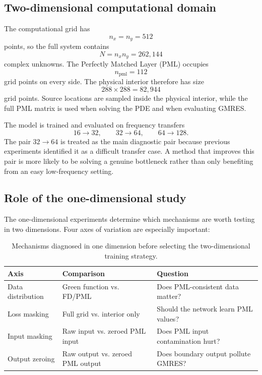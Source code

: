 \subsection{Two-dimensional computational domain}
\label{subsec:methodology_2d_grid}

The computational grid has
\[
    n_x = n_y = 512
\]
points, so the full system contains
\[
    N = n_x n_y = 262{,}144
\]
complex unknowns. The Perfectly Matched Layer (PML) occupies
\[
    n_{\mathrm{pml}} = 112
\]
grid points on every side. The physical interior therefore has size
\[
    288 \times 288 = 82{,}944
\]
grid points. Source locations are sampled inside the physical interior, while
the full PML matrix is used when solving the PDE and when evaluating GMRES.

The model is trained and evaluated on frequency transfers
\[
    16 \to 32,
    \qquad
    32 \to 64,
    \qquad
    64 \to 128.
\]
The pair $32 \to 64$ is treated as the main diagnostic pair because previous
experiments identified it as a difficult transfer case. A method that improves
this pair is more likely to be solving a genuine bottleneck rather than only
benefiting from an easy low-frequency setting.


\subsection{Role of the one-dimensional study}
\label{subsec:methodology_2d_role_of_1d}

The one-dimensional experiments determine which mechanisms are worth testing
in two dimensions. Four axes of variation are especially important:
\begin{table}[h]
\centering
\begin{tabular}{lll}
\toprule
Axis & Comparison & Question \\
\midrule
Data distribution & Green function vs. FD/PML & Does PML-consistent data matter? \\
Loss masking & Full grid vs. interior only & Should the network learn PML values? \\
Input masking & Raw input vs. zeroed PML input & Does PML input contamination hurt? \\
Output zeroing & Raw output vs. zeroed PML output & Does boundary output pollute GMRES? \\
\bottomrule
\end{tabular}
\caption{Mechanisms diagnosed in one dimension before selecting the
two-dimensional training strategy.}
\label{tab:twod_axes_from_1d}
\end{table}

